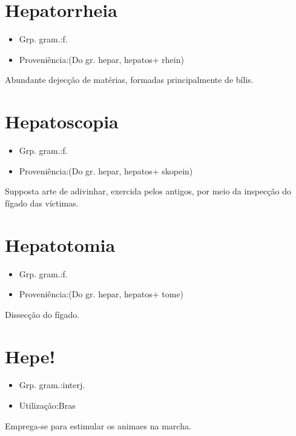\documentclass{article}
\begin{document}
\section{Hepatorrheia}
\begin{itemize}
\item {Grp. gram.:f.}
\end{itemize}
\begin{itemize}
\item {Proveniência:(Do gr. \textunderscore hepar\textunderscore , \textunderscore hepatos\textunderscore  + \textunderscore rhein\textunderscore )}
\end{itemize}
Abundante dejecção de matérias, formadas principalmente de bílis.
\section{Hepatoscopia}
\begin{itemize}
\item {Grp. gram.:f.}
\end{itemize}
\begin{itemize}
\item {Proveniência:(Do gr. \textunderscore hepar\textunderscore , \textunderscore hepatos\textunderscore  + \textunderscore skopein\textunderscore )}
\end{itemize}
Supposta arte de adivinhar, exercida pelos antigos, por meio da inspecção do fígado das víctimas.
\section{Hepatotomia}
\begin{itemize}
\item {Grp. gram.:f.}
\end{itemize}
\begin{itemize}
\item {Proveniência:(Do gr. \textunderscore hepar\textunderscore , \textunderscore hepatos\textunderscore  + \textunderscore tome\textunderscore )}
\end{itemize}
Dissecção do fígado.
\section{Hepe!}
\begin{itemize}
\item {Grp. gram.:interj.}
\end{itemize}
\begin{itemize}
\item {Utilização:Bras}
\end{itemize}
Emprega-se para estimular os animaes na marcha.
\end{document}
